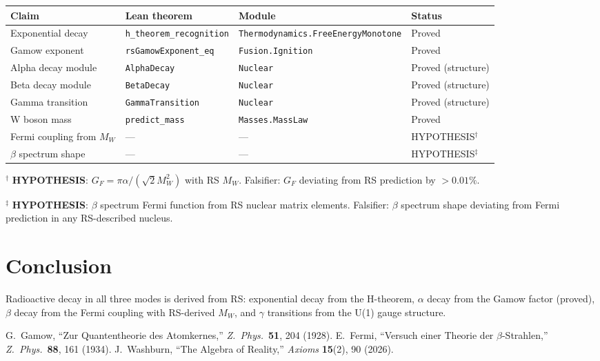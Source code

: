 \documentclass[12pt,a4paper]{article}
\theoremstyle{definition}
\theoremstyle{remark}
\begin{document}
\begin{center}
\begin{tabular}{llll}
\toprule
Claim & Lean theorem & Module & Status \\
\midrule
Exponential decay & \texttt{h\_theorem\_recognition} & \texttt{Thermodynamics.FreeEnergyMonotone} & Proved \\
Gamow exponent & \texttt{rsGamowExponent\_eq} & \texttt{Fusion.Ignition} & Proved \\
Alpha decay module & \texttt{AlphaDecay} & \texttt{Nuclear} & Proved (structure) \\
Beta decay module & \texttt{BetaDecay} & \texttt{Nuclear} & Proved (structure) \\
Gamma transition & \texttt{GammaTransition} & \texttt{Nuclear} & Proved (structure) \\
W boson mass & \texttt{predict\_mass} & \texttt{Masses.MassLaw} & Proved \\
\midrule
Fermi coupling from $M_W$ & --- & --- & HYPOTHESIS$^\dagger$ \\
$\beta$ spectrum shape & --- & --- & HYPOTHESIS$^\ddagger$ \\
\bottomrule
\end{tabular}
\end{center}

$^\dagger$ \textbf{HYPOTHESIS}: $G_F = \pi\alpha/(\sqrt{2}M_W^2)$ with RS $M_W$. Falsifier: $G_F$ deviating from RS prediction by $> 0.01\%$.

$^\ddagger$ \textbf{HYPOTHESIS}: $\beta$ spectrum Fermi function from RS nuclear matrix elements. Falsifier: $\beta$ spectrum shape deviating from Fermi prediction in any RS-described nucleus.

\section{Conclusion}

Radioactive decay in all three modes is derived from RS: exponential
decay from the H-theorem, $\alpha$ decay from the Gamow factor (proved),
$\beta$ decay from the Fermi coupling with RS-derived $M_W$, and $\gamma$
transitions from the U(1) gauge structure.

\begin{thebibliography}{99}
 G.~Gamow, ``Zur Quantentheorie des Atomkernes,'' \textit{Z.\ Phys.}\ \textbf{51}, 204 (1928).
 E.~Fermi, ``Versuch einer Theorie der $\beta$-Strahlen,'' \textit{Z.\ Phys.}\ \textbf{88}, 161 (1934).
 J.~Washburn, ``The Algebra of Reality,'' \textit{Axioms} \textbf{15}(2), 90 (2026).
\end{thebibliography}
\end{document}

